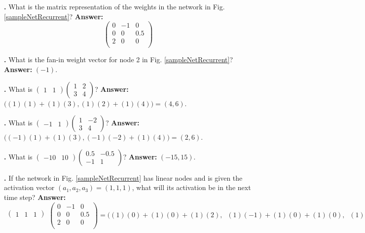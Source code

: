 \noindent
{}
{\bf \theLinearAlgebraCounter.}  What is the matrix representation of the weights in the network in Fig. \ref{sampleNetRecurrent}?
{\bf Answer:}  
\[
\begin{pmatrix}
 0  &   -1 & 0 \\
 0  &   0 & 0.5 \\
 2  &   0 & 0 \\
\end{pmatrix}
\]
\bigskip

\noindent
{}
{\bf \theLinearAlgebraCounter.}  What is the fan-in weight vector for node 2 in Fig. \ref{sampleNetRecurrent}?
{\bf Answer:}  $(-1)$. 
\bigskip

\noindent
{}
{\bf \theLinearAlgebraCounter.}  What is
$\begin{pmatrix}1 & 1\end{pmatrix}\begin{pmatrix} 1 & 2  \\ 3 & 4 \end{pmatrix}$?
{\bf Answer:}  $\Big((1)(1) + (1)(3), (1)(2) + (1)(4)\Big)  = (4,6)$. 
\bigskip

\noindent
{}
{\bf \theLinearAlgebraCounter.}  What is
$\begin{pmatrix}-1 & 1\end{pmatrix}\begin{pmatrix} 1 & -2  \\ 3 & 4 \end{pmatrix}$?
{\bf Answer:}  $\Big((-1)(1) + (1)(3), (-1)(-2) + (1)(4)\Big)  = (2,6)$. 
\bigskip

\noindent
{}
{\bf \theLinearAlgebraCounter.}  What is
$\begin{pmatrix}-10 & 10\end{pmatrix}\begin{pmatrix} 0.5 & -0.5  \\ -1 &  1\end{pmatrix}$?
{\bf Answer:} $(-15,15)$. 
\bigskip


\noindent
{}\label{linAlgPractice1}
{\bf \theLinearAlgebraCounter.}  If the network in Fig. \ref{sampleNetRecurrent} has linear nodes and is given the activation vector $(a_1,a_2,a_3) = (1,1,1)$, what will its activation be in the next time step?
{\bf Answer:} 
\[
  \begin{matrix}\begin{pmatrix}1 & 1 & 1\end{pmatrix}\\\mbox{}\end{matrix}
 \begin{pmatrix}
 0  &   -1 & 0 \\
 0  &   0 & 0.5 \\
 2  &   0 & 0 \\
\end{pmatrix}
  =
  \bigg( (1)(0) + (1)(0) + (1)(2) ,\;\; (1)(-1) + (1)(0) + (1)(0) ,\;\; (1)(0) + (1)(.5) + (1)(0) \bigg)
  =  (2,-1,0.5)
\]
\bigskip

